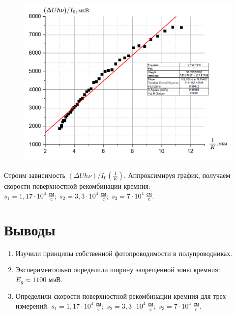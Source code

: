 \documentclass[a4paper, 12pt]{article}
\begin{document}
\begin{figure}[h!]
\begin{center}
\begin{minipage}[h!]{0.495\linewidth}
\label{ris:experimcoded}

\end{minipage}
\hfill 
\begin{minipage}[h!]{0.495\linewidth}
\includegraphics[width=1\linewidth]{img/l9.png}

\label{ris:experimcoded}

\end{minipage}

\caption{}
\end{center}
\end{figure}


Строим зависимость $(\Delta Uh\nu)/I_0(\frac{1}{K})$. Аппроксимируя график, получаем скорости поверхностной рекомбинации кремния: $s_1=1,17\cdot10^{4} \; \frac{\text{см}}{\text{с}}; \; s_2=3,3\cdot10^{4} \; \frac{\text{см}}{\text{с}}; \; s_3=7\cdot10^{4} \; \frac{\text{см}}{\text{с}}$.


\section{Выводы}
\begin{enumerate}
\item Изучили принципы собственной фотопроводимости в полупроводниках.
\item Экспериментально определили ширину запрещенной зоны кремния: $E_g\approx1100$ мэВ.
\item Определили скорости поверхностной рекомбинации кремния для трех измерений: $s_1=1,17\cdot10^{4} \; \frac{\text{см}}{\text{с}}; \; s_2=3,3\cdot10^{4} \; \frac{\text{см}}{\text{с}}; \; s_3=7\cdot10^{4} \; \frac{\text{см}}{\text{с}}$.
\end{enumerate}
\end{document}
